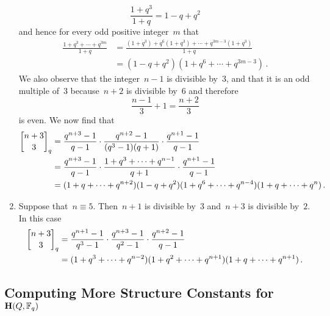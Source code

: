 \documentclass[a4paper, 11pt, twoside=semi]{scrartcl}
\begin{document}
\begin{enumerate}[label = {Case \arabic*.}]
    \[
      \frac{1 + q^3}{1 + q}
      =
      1 - q + q^2
    \]
    and hence for every odd positive integer~$m$ that
    \begin{align*}
      \frac{1 + q^3 + \dotsb + q^{3m}}{1 + q}
      &=
      \frac{(1 + q^3) + q^6 (1 + q^3) + \dotsb + q^{3m-3} (1 + q^3)}{1 + q}
      \\
      &=
      (1 - q + q^2) (1 + q^6 + \dotsb + q^{3m-3}) \,.
    \end{align*}
    We also observe that the integer~$n-1$ is divisible by~$3$, and that it is an odd multiple of~$3$ because~$n+2$ is divisible by~$6$ and therefore
    \[
      \frac{n-1}{3} + 1
      =
      \frac{n+2}{3}
    \]
    is even.
    We now find that
    \begin{align*}
      \qbinom{n+3}{3}_q
      &=
      \frac{ q^{n+3} - 1 }{ q - 1 }
      \cdot
      \frac{ q^{n+2} - 1 }{ (q^3 - 1)(q + 1) }
      \cdot
      \frac{ q^{n+1} - 1 }{ q - 1 }
      \\
      &=
      \frac{ q^{n+3} - 1 }{ q - 1 }
      \cdot
      \frac{ 1 + q^3 + \dotsb + q^{n-1} }{ q + 1 }
      \cdot
      \frac{ q^{n+1} - 1 }{ q - 1 }
      \\
      &=
      (1 + q + \dotsb + q^{n+2})
      (1 - q + q^2)(1 + q^6 + \dotsb + q^{n-4})
      (1 + q + \dotsb + q^n) \,.
    \end{align*}
  \item
    Suppose that~$n \equiv 5$.
    Then~$n+1$ is divisible by~$3$ and~$n+3$ is divisible by~$2$.
    In this case
    \begin{align*}
      \qbinom{n+3}{3}_q
      &=
      \frac{ q^{n+1} - 1 }{ q^3 - 1 }
      \cdot
      \frac{ q^{n+3} - 1 }{ q^2 - 1 }
      \cdot
      \frac{ q^{n+2} - 1 }{ q - 1 }
      \\
      &=
      (1 + q^3 + \dotsb + q^{n-2}) (1 + q^2 + \dotsb + q^{n+1}) (1 + q + \dotsb + q^{n+1}) \,.
    \end{align*}
\end{enumerate}


\subsection{Computing More Structure Constants for~$\mathbf{H}(Q, \mathbb{F}_q)$}
\label{computing more structure constants}
\end{document}
